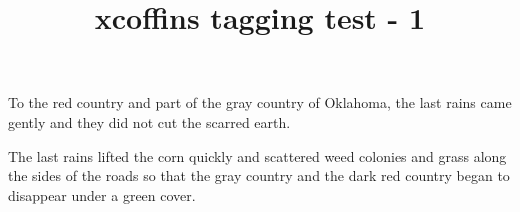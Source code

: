 \documentclass{article}
\title{xcoffins tagging test - 1}
\begin{document}
\SetHorizontalCoffin{}

To the red country and part of the gray country of Oklahoma, the last rains came gently and they did not cut the scarred earth.

The last rains lifted the corn quickly and scattered weed colonies and grass along the sides of the roads so that the gray country and the dark red country began to disappear under a green cover.
\end{document}
